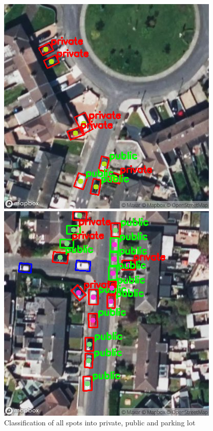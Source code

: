 \begin{figure}[htbp]
\begin{minipage}{0.45\textwidth}
    \end{minipage}
    \hfill
    \begin{minipage}{0.45\textwidth}
        \centering
        \includegraphics[width=\textwidth]{images/classification3.png}
    \end{minipage}
    \hfill
    \begin{minipage}{0.45\textwidth}
        \centering
        \includegraphics[width=\textwidth]{images/classification4.png}
    \end{minipage}
    \caption{Classification of all spots into private, public and parking lot}
    \label{fig:classification_all_spots}
\end{figure}

